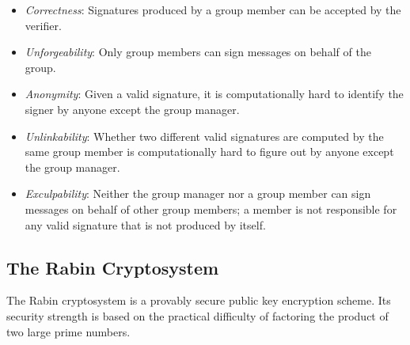 \documentclass[letterpaper,12pt]{article}
\begin{document}
\begin{itemize}
\item \emph{Correctness}: Signatures produced by a group member can be accepted by the verifier.

\item \emph{Unforgeability}: Only group members can sign messages on behalf of the group.

\item \emph{Anonymity}: Given a valid signature, it is computationally hard to identify the signer by anyone except the group manager.

\item \emph{Unlinkability}: Whether two different valid signatures are computed by the same group member is computationally hard to figure out by anyone except the group manager.

\item \emph{Exculpability}: Neither the group manager nor a group member can sign messages on behalf of other group members; a member is not responsible for any valid signature that is not produced by itself.
\end{itemize}

\subsection{The Rabin Cryptosystem}
The Rabin cryptosystem \cite{rabin1979digital} is a provably secure public key encryption scheme. Its security strength is based on the practical difficulty of factoring the product of two large prime numbers.
\end{document}
